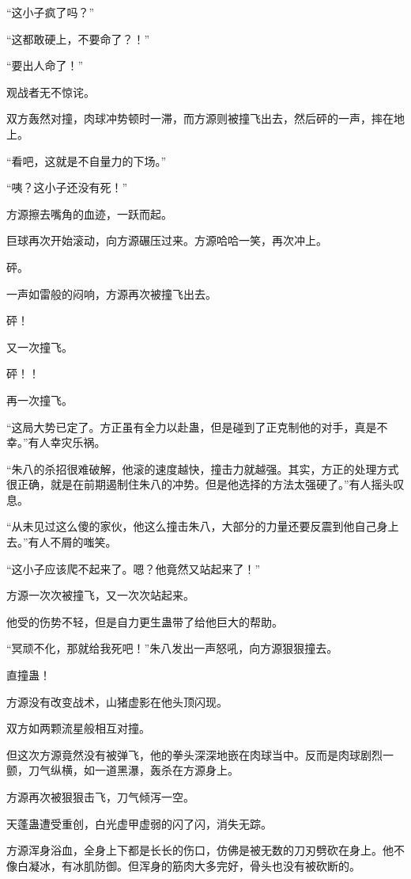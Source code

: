 \begin{this_body}
“这小子疯了吗？”

“这都敢硬上，不要命了？！”

“要出人命了！”

观战者无不惊诧。

双方轰然对撞，肉球冲势顿时一滞，而方源则被撞飞出去，然后砰的一声，摔在地上。

“看吧，这就是不自量力的下场。”

“咦？这小子还没有死！”

方源擦去嘴角的血迹，一跃而起。

巨球再次开始滚动，向方源碾压过来。方源哈哈一笑，再次冲上。

砰。

一声如雷般的闷响，方源再次被撞飞出去。

砰！

又一次撞飞。

砰！！

再一次撞飞。

“这局大势已定了。方正虽有全力以赴蛊，但是碰到了正克制他的对手，真是不幸。”有人幸灾乐祸。

“朱八的杀招很难破解，他滚的速度越快，撞击力就越强。其实，方正的处理方式很正确，就是在前期遏制住朱八的冲势。但是他选择的方法太强硬了。”有人摇头叹息。

“从未见过这么傻的家伙，他这么撞击朱八，大部分的力量还要反震到他自己身上去。”有人不屑的嗤笑。

“这小子应该爬不起来了。嗯？他竟然又站起来了！”

方源一次次被撞飞，又一次次站起来。

他受的伤势不轻，但是自力更生蛊带了给他巨大的帮助。

“冥顽不化，那就给我死吧！”朱八发出一声怒吼，向方源狠狠撞去。

直撞蛊！

方源没有改变战术，山猪虚影在他头顶闪现。

双方如两颗流星般相互对撞。

但这次方源竟然没有被弹飞，他的拳头深深地嵌在肉球当中。反而是肉球剧烈一颤，刀气纵横，如一道黑瀑，轰杀在方源身上。

方源再次被狠狠击飞，刀气倾泻一空。

天蓬蛊遭受重创，白光虚甲虚弱的闪了闪，消失无踪。

方源浑身浴血，全身上下都是长长的伤口，仿佛是被无数的刀刃劈砍在身上。他不像白凝冰，有冰肌防御。但浑身的筋肉大多完好，骨头也没有被砍断的。


\end{this_body}
